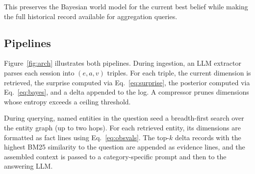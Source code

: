 \documentclass[11pt,a4paper,twocolumn]{article}
\begin{document}
This preserves the Bayesian world model for the current best belief while
making the full historical record available for aggregation queries.

\subsection{Pipelines}

Figure~\ref{fig:arch} illustrates both pipelines. During ingestion, an LLM
extractor parses each session into $(e,a,v)$ triples. For each triple, the
current dimension is retrieved, the surprise computed via Eq.~\ref{eq:surprise},
the posterior computed via Eq.~\ref{eq:bayes}, and a delta appended to the
log. A compressor prunes dimensions whose entropy exceeds a ceiling threshold.

During querying, named entities in the question seed a breadth-first search
over the entity graph (up to two hops). For each retrieved entity, its
dimensions are formatted as fact lines using Eq.~\ref{eq:obsvals}. The top-$k$
delta records with the highest BM25 similarity to the question are appended as
evidence lines, and the assembled context is passed to a category-specific
prompt and then to the answering LLM.
\end{document}
